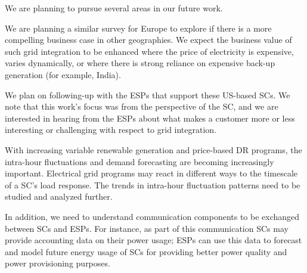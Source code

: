 We are planning to pursue several areas in our future work.

We are planning a similar survey for Europe to explore if there is a more compelling business case 
in other geographies.
We expect the business value of such grid integration to be enhanced where the price of 
electricity is expensive, varies dynamically, or where there is strong reliance on expensive back-up 
generation (for example, India).  

We plan on following-up with the ESPs that support these US-based SCs. We note that this work's focus was from the perspective of the SC, and 
we are interested in hearing from the ESPs about what makes a customer more or less interesting or 
challenging with respect to grid integration.

With increasing variable renewable generation and price-based DR programs, the intra-hour fluctuations 
and demand forecasting are becoming increasingly important.
Electrical grid programs may react in different ways to the timescale of a SC's load response. The trends in intra-hour fluctuation patterns need to be studied and analyzed further.

In addition, we need to understand communication components to be exchanged between SCs and ESPs. For instance, as part of this communication SCs may provide accounting data on their power usage; ESPs can use this data to forecast and model future energy usage of SCs for providing better power quality and power provisioning purposes.



